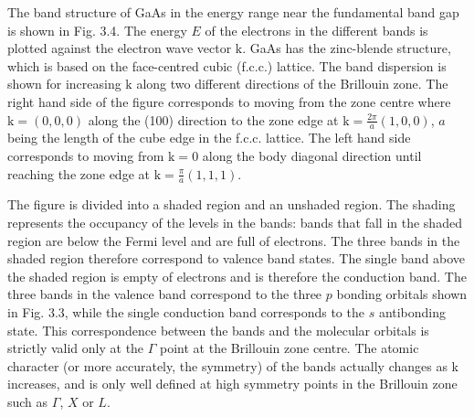 \documentclass[12pt]{book}
\begin{document}
The band structure of GaAs in the energy range near the fundamental band gap is shown in Fig. 3.4. The energy $E$ of the electrons in the different bands is plotted against the electron wave vector $\mathrm{k}$. GaAs has the zinc-blende structure, which is based on the face-centred cubic (f.c.c.) lattice. The band dispersion is shown for increasing $\mathrm{k}$ along two different directions of the Brillouin zone. The right hand side of the figure corresponds to moving from the zone centre where $\mathrm{k}=(0, 0, 0)$ along the (100) direction to the zone edge at $\mathrm{k} = \frac{2\pi}{a} (1, 0, 0)$, $a$ being the length of the cube edge in the f.c.c. lattice. The left hand side corresponds to moving from $\mathrm{k}=0$ along the body diagonal direction until reaching the zone edge at $\mathrm{k} = \frac{\pi}{a}(1 , 1, 1)$.

The figure is divided into a shaded region and an unshaded region. The shading represents the occupancy of the levels in the bands: bands that fall in the shaded region are below the Fermi level and are full of electrons. The three bands in the shaded region therefore correspond to valence band states. The single band above the shaded region is empty of electrons and is therefore the conduction band. The three bands in the valence band correspond to the three $p$ bonding orbitals shown in Fig. 3.3, while the single conduction band corresponds to the $s$ antibonding state. This correspondence between the bands and the molecular orbitals is strictly valid only at the $\Gamma$ point at the Brillouin zone centre. The atomic character (or more accurately, the symmetry) of the bands actually changes as k increases, and is only well defined at high symmetry points in the Brillouin zone such as $\Gamma$, $X$ or $L$.

\end{document}
